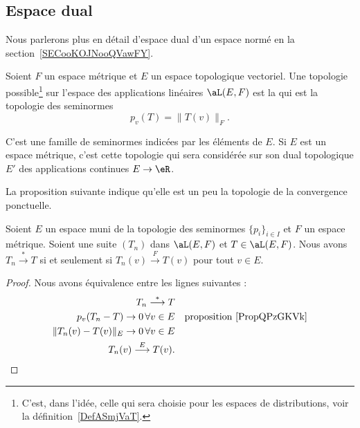 \subsection{Espace dual}

Nous parlerons plus en détail d'espace dual d'un espace normé en la section~\ref{SECooKOJNooQVawFY}.

\begin{definition}  \label{DefHUelCDD}
    Soient \( F\) un espace métrique et \( E\) un espace topologique vectoriel. Une topologie possible\footnote{C'est, dans l'idée, celle qui sera choisie pour les espaces de distributions, voir la définition~\ref{DefASmjVaT}.} sur l'espace des applications linéaires \( \aL(E,F)\) est la  qui est la topologie des seminormes
    \begin{equation}
        p_v(T)=\| T(v) \|_F.
    \end{equation}
\end{definition}
C'est une famille de seminormes indicées par les éléments de \( E\). Si \( E\) est un espace métrique, c'est cette topologie qui sera considérée sur son dual topologique \( E'\) des applications continues \( E\to \eR\).

La proposition suivante indique qu'elle est un peu la topologie de la convergence ponctuelle.
\begin{proposition}
    Soient \( E\) un espace muni de la topologie des seminormes \( \{ p_i \}_{i\in I}\) et \( F\) un espace métrique. Soient une suite \( (T_n)\) dans \( \aL(E,F)\) et \( T\in \aL(E,F)\). Nous avons \( T_n\stackrel{*}{\longrightarrow}T\) si et seulement si \( T_n(v)\stackrel{F}{\longrightarrow}T(v)\) pour tout \( v\in E\).
\end{proposition}

\begin{proof}
    Nous avons équivalence entre les lignes suivantes :
    \begin{subequations}
        \begin{align}
            T_n\stackrel{*}{\longrightarrow}T\\
            p_v(T_n-T)\to 0\,\forall v\in E &&\text{proposition~\ref{PropQPzGKVk}}\\
            \| T_n(v)-T(v) \|_E\to 0\,\forall v\in E\\
            T_n(v)\stackrel{E}{\longrightarrow}T(v).
        \end{align}
    \end{subequations}
\end{proof}


